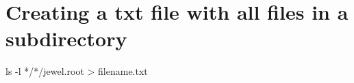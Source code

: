 \documentclass[12pt]{article}
\begin{document}
\section{Creating a txt file with all files in a subdirectory}

\begin{tcolorbox}
\begin{verbnobox}[\scriptsize]
ls -l */*/jewel.root > filename.txt
\end{verbnobox}  
\end{tcolorbox}





\end{document}
